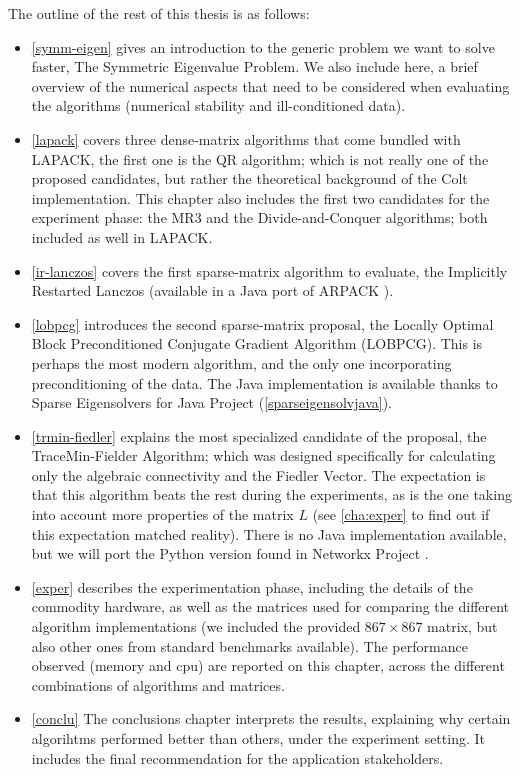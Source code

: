 The outline of the rest of this thesis is as follows: \\

\begin{itemize}
  \item \cref{symm-eigen} gives an introduction to the generic problem
    we want to solve faster, The Symmetric Eigenvalue Problem. We also
    include here, a brief overview of the numerical aspects that need
    to be considered when evaluating the algorithms (numerical
    stability and ill-conditioned data). \\
  \item \cref{lapack} covers three dense-matrix algorithms that come bundled with
    LAPACK, the first one is the QR algorithm; which is not really one
    of the proposed candidates, but rather the theoretical background
    of the Colt implementation. This chapter also includes the first two
    candidates for the experiment phase: the MR3 and the
    Divide-and-Conquer algorithms; both included as well in LAPACK. \\
  \item \cref{ir-lanczos} covers the first sparse-matrix algorithm to
    evaluate, the Implicitly Restarted Lanczos (available in a Java
    port of ARPACK \cite{arpack}). \\
  \item \cref{lobpcg} introduces the second sparse-matrix proposal,
    the Locally Optimal Block Preconditioned Conjugate Gradient
    Algorithm (LOBPCG). This is perhaps the most modern algorithm, and
    the only one incorporating preconditioning of the data. The Java
    implementation is available thanks to Sparse Eigensolvers for Java
    Project (\cref{sparseigensolvjava}).\\
  \item \cref{trmin-fiedler} explains the most specialized candidate
    of the proposal, the TraceMin-Fielder Algorithm; which was designed
    specifically for calculating only the algebraic connectivity and
    the Fiedler Vector. The expectation is that this algorithm beats the rest
    during the experiments, as is the one taking into account more
    properties of the matrix $L$ (see \cref{cha:exper} to find out if
    this expectation matched reality). There is no Java implementation
    available, but we will port the Python version found in Networkx
    Project \cite{networkx}. 
  \item \cref{exper} describes the experimentation phase, including
    the details of the commodity hardware, as well as the matrices
    used for comparing the different algorithm
    implementations (we included the provided $867 \times 867$
    matrix, but also other ones from standard benchmarks
    available). The performance observed (memory and cpu) are reported
    on this chapter, across the different combinations of algorithms
    and matrices. \\
  \item \cref{conclu} The conclusions chapter interprets the results,
    explaining why certain algorihtms performed better than others,
    under the experiment setting. It includes the final recommendation
    for the application stakeholders.
\end{itemize}

